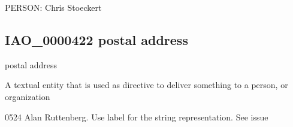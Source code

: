 \documentclass[letterpaper,10pt,english]{sphinxmanual}
\begin{document}
\begin{sphinxShadowBox}

\sphinxAtStartPar
{}
\end{sphinxShadowBox}

\begin{sphinxShadowBox}

\sphinxAtStartPar
PERSON: Chris Stoeckert
\end{sphinxShadowBox}
\begin{quote}

\ignorespaces \end{quote}


\subsection{IAO\_0000422 \sphinxhyphen{} postal address}
\label{\detokenize{doc-IAO_0000422:iao-0000422-postal-address}}\label{\detokenize{doc-IAO_0000422:index-0}}\label{\detokenize{doc-IAO_0000422::doc}}
\begin{sphinxShadowBox}

\sphinxAtStartPar
postal address
\end{sphinxShadowBox}

\begin{sphinxShadowBox}

\sphinxAtStartPar
{\hyperref[\detokenize{doc-IAO_0000030::doc}]{}}
\end{sphinxShadowBox}

\begin{sphinxShadowBox}

\sphinxAtStartPar
A textual entity that is used as directive to deliver something to a person, or organization
\end{sphinxShadowBox}

\begin{sphinxShadowBox}

\sphinxhyphen{}05\sphinxhyphen{}24 Alan Ruttenberg. Use label for the string representation. See issue 
\end{sphinxShadowBox}
\end{document}

